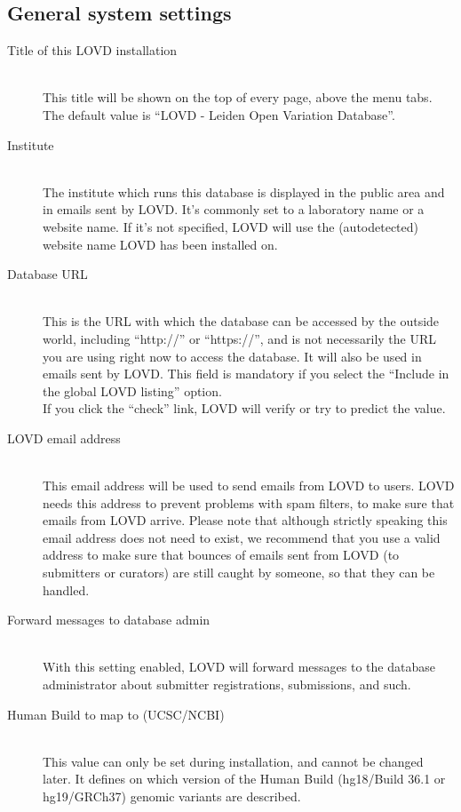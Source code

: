 \documentclass[a4paper,oneside,openany,12pt]{memoir}
\begin{document}
\subsection{General system settings}
\begin{description}
  \item[Title of this LOVD installation] \hfill \\
  This title will be shown on the top of every page, above the menu tabs.
  The default value is ``LOVD - Leiden Open Variation Database''.
  \item[Institute] \hfill \\
  The institute which runs this database is displayed in the public area and in emails sent by LOVD.
  It's commonly set to a laboratory name or a website name.
  If it's not specified, LOVD will use the (autodetected) website name LOVD has been installed on.
  \pagebreak[4] %
  \item[Database URL] \hfill \\
  This is the URL with which the database can be accessed by the outside world, including ``http://'' or ``https://'', and is not necessarily the URL you are using right now to access the database.
  It will also be used in emails sent by LOVD.
  This field is mandatory if you select the ``Include in the global LOVD listing'' option.
  \\
  If you click the ``check'' link, LOVD will verify or try to predict the value.
  \item[LOVD email address] \hfill \\
  This email address will be used to send emails from LOVD to users.
  LOVD needs this address to prevent problems with spam filters, to make sure that emails from LOVD arrive.
  Please note that although strictly speaking this email address does not need to exist,
  we recommend that you use a valid address to make sure that bounces of emails sent from LOVD (to submitters or curators) are still caught by someone, so that they can be handled.
  \item[Forward messages to database admin] \hfill \\
  With this setting enabled, LOVD will forward messages to the database administrator about submitter registrations, submissions, and such.
  \item[Human Build to map to (UCSC/NCBI)] \hfill \\
  This value can only be set during installation, and cannot be changed later.
  It defines on which version of the Human Build (hg18/Build 36.1 or hg19/GRCh37) genomic variants are described.

\end{description}
\end{document}
